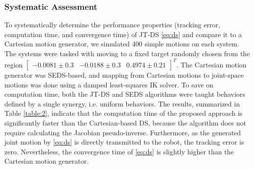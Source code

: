 \documentclass[letterpaper, 10 pt, conference,fleqn]{ieeeconf}
\begin{document}
\subsubsection{Systematic Assessment}
To systematically determine the performance properties (tracking error, computation time, and convergence time) of JT-DS \eqref{eq:ds} and compare it to a Cartesian motion generator, we simulated $400$ simple motions on each system. The systems were tasked with moving to a fixed target randomly chosen from the region $\begin{bmatrix} -0.0081\pm0.3&-0.0188\pm0.3&0.4974\pm0.21 \end{bmatrix}^T$. The Cartesian motion generator was SEDS-based, and mapping from Cartesian motions to joint-space motions was done using a damped least-squares IK solver. To save on computation time, both the JT-DS and SEDS algorithms were taught behaviors defined by a single synergy, i.e. uniform behaviors.  The results, summarized in Table \ref{table:2}, indicate that the computation time of the proposed approach is significantly faster than the Cartesian-based DS, because the algorithm does not require calculating the Jacobian pseudo-inverse. Furthermore, as the generated joint motion by \eqref{eq:ds} is directly transmitted to the robot, the tracking error is zero. Nevertheless, the convergence time of  \eqref{eq:ds} is slightly higher than the Cartesian motion generator.
\end{document}
